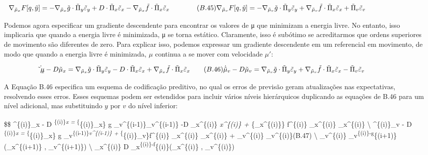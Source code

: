 \documentclass[
  12pt,
]{book}
\begin{document}
\[
\nabla_{\tilde \mu_x}F[q,\tilde y] = - \nabla_{\tilde \mu_x}\tilde g \cdot \tilde \Pi_y \tilde \varepsilon_y + D\cdot \tilde \Pi_x \tilde \varepsilon_x - \nabla_{\tilde \mu_x}\tilde f \cdot \tilde \Pi_x \tilde \varepsilon_x \qquad\qquad (B.45) \\
\nabla_{\tilde \mu_v}F[q,\tilde y] = - \nabla_{\tilde \mu_v}\tilde g \cdot \tilde \Pi_y \tilde \varepsilon_y + \nabla_{\tilde \mu_v} \tilde f\cdot \tilde \Pi_x \tilde \varepsilon_x + \tilde \Pi_v \tilde \varepsilon_v \qquad\qquad\qquad\qquad\]

Podemos agora especificar um gradiente descendente para encontrar os valores de μ que minimizam a energia livre. No entanto, isso implicaria que quando a energia livre é minimizada, μ se torna estático. Claramente, isso é subótimo se acreditarmos que ordens superiores de movimento são diferentes de zero. Para explicar isso, podemos expressar um gradiente descendente em um referencial em movimento, de modo que quando a energia livre é minimizada, \(\mu\) continua a se mover com velocidade \(\mu'\):

\[ \dot {\tilde \mu_x} - D \tilde \mu_x = \nabla_{\tilde \mu_x} \tilde g \cdot \tilde\Pi_y\tilde \varepsilon_y -D \cdot \tilde \Pi_x \tilde \varepsilon_x + \nabla_{\tilde \mu_x} \tilde f \cdot \tilde \Pi_x \tilde \varepsilon_x \qquad (B.46) \\
\dot {\tilde \mu}_v - D \tilde \mu_v = \nabla_{\tilde \mu_v} \tilde g \cdot \tilde\Pi_y\tilde \varepsilon_y + \nabla_{\tilde \mu_v} \tilde f \cdot \tilde \Pi_x \tilde \varepsilon_x - \tilde \Pi_v \tilde \varepsilon_v \qquad \qquad
\]

A Equação B.46 especifica um esquema de codificação preditivo, no qual os erros de previsão geram atualizações nas expectativas, resolvendo esses erros. Esses esquemas podem ser estendidos para incluir vários níveis hierárquicos duplicando as equações de B.46 para um nível adicional, mas substituindo \(y\) por \(v\) do nível inferior:

\$\$ \dot {\tilde \mu}\^{}\{(i)\}\_x - D \tilde \mu\textsuperscript{\{(i)\}\emph{x = \nabla}\{\tilde \mu}\{(i)\}\_x\} \tilde g \cdot \tilde\Pi\_v\^{}\{(i-1)\}\tilde \varepsilon\_v\^{}\{(i-1)\} -D \cdot \tilde \Pi\_x\^{}\{(i)\} \tilde \varepsilon\emph{x\^{}\{(i)\} + \nabla}\{\tilde \mu\_x\^{}\{(i)\}\} \tilde f\^{}\{(i)\} \cdot \tilde \Pi\_x\^{}\{(i)\} \tilde \varepsilon\_x\^{}\{(i)\} \qquad \qquad \textbackslash{}
\dot {\tilde \mu}\^{}\{(i)\}\_v - D \tilde \mu\textsuperscript{\{(i)\}\emph{x = \nabla}\{\tilde \mu}\{(i)\}\_x\} \tilde g \cdot \tilde\Pi\_v\textsuperscript{\{(i-1)\}\tilde \varepsilon\emph{v\^{}\{(i-1)\} + \nabla}\{\tilde \mu}\{(i)\}\_v\}\tilde f\^{}\{(i)\} \cdot \tilde \Pi\_x\^{}\{(i)\} \tilde \varepsilon\_x\^{}\{(i)\} + \tilde \Pi\_v\^{}\{(i)\} \tilde \varepsilon\_v\^{}\{(i)\}\qquad (B.47) \textbackslash{}
\tilde \varepsilon\_v\^{}\{(i)\} \triangleq \tilde \mu\_v\textsuperscript{\{(i)\}-\tilde g}\{(i+1)\}(\tilde \mu\_x\^{}\{(i+1)\} , \tilde \mu\_v\^{}\{(i+1)\}) \qquad \textbackslash{}
\tilde \varepsilon\_x\^{}\{(i)\} \triangleq  D \tilde \mu\_x\textsuperscript{\{(i)\}-\tilde f}\{(i)\}(\tilde \mu\_x\^{}\{(i)\} , \tilde \mu\_v\^{}\{(i)\})
\end{document}
